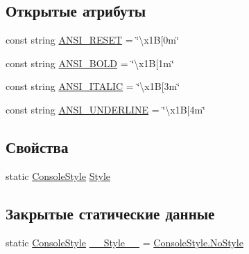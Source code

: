 \subsection*{Открытые атрибуты}
\begin{DoxyCompactItemize}
\item 
const string \hyperlink{class_a_s_c_i_i_wars_1_1_console_graphics_1_1_my_console_a08a9b176141ff0c51559234ffb0ad127}{A\+N\+S\+I\+\_\+\+R\+E\+S\+ET} = \char`\"{}\textbackslash{}x1B\mbox{[}0m\char`\"{}
\item 
const string \hyperlink{class_a_s_c_i_i_wars_1_1_console_graphics_1_1_my_console_ac0edfa66a89ea22bdc8315c357665fba}{A\+N\+S\+I\+\_\+\+B\+O\+LD} = \char`\"{}\textbackslash{}x1B\mbox{[}1m\char`\"{}
\item 
const string \hyperlink{class_a_s_c_i_i_wars_1_1_console_graphics_1_1_my_console_a78301f49f068fdc8f836db81945b29e5}{A\+N\+S\+I\+\_\+\+I\+T\+A\+L\+IC} = \char`\"{}\textbackslash{}x1B\mbox{[}3m\char`\"{}
\item 
const string \hyperlink{class_a_s_c_i_i_wars_1_1_console_graphics_1_1_my_console_a1730e5dfb4c14b688b5d7451c4a71e30}{A\+N\+S\+I\+\_\+\+U\+N\+D\+E\+R\+L\+I\+NE} = \char`\"{}\textbackslash{}x1B\mbox{[}4m\char`\"{}
\end{DoxyCompactItemize}
\subsection*{Свойства}
\begin{DoxyCompactItemize}
\item 
static \hyperlink{namespace_a_s_c_i_i_wars_1_1_console_graphics_a9b323f4b2bf48062c9245b24e74b2882}{Console\+Style} \hyperlink{class_a_s_c_i_i_wars_1_1_console_graphics_1_1_my_console_a2a25ec7c9c245a9a479453f71bd30c2d}{Style}
\end{DoxyCompactItemize}
\subsection*{Закрытые статические данные}
\begin{DoxyCompactItemize}
\item 
static \hyperlink{namespace_a_s_c_i_i_wars_1_1_console_graphics_a9b323f4b2bf48062c9245b24e74b2882}{Console\+Style} \hyperlink{class_a_s_c_i_i_wars_1_1_console_graphics_1_1_my_console_a261e68f3fe9fa1ba12f21cb4e7a2e5f0}{\+\_\+\+\_\+\+Style\+\_\+\+\_\+} = \hyperlink{namespace_a_s_c_i_i_wars_1_1_console_graphics_a9b323f4b2bf48062c9245b24e74b2882aaf0ab25243139e9c44bdbfbde2ce6f1d}{Console\+Style.\+No\+Style}
\end{DoxyCompactItemize}


